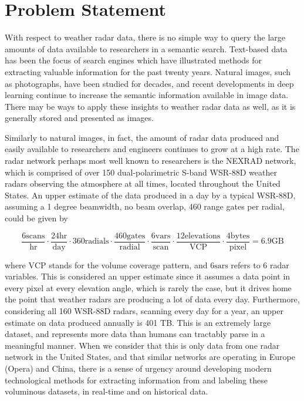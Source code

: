 \section{Problem Statement}
\label{sec:introduction_problem}

With respect to weather radar data, there is no simple way to query the large amounts of data available to researchers in a semantic search.
Text-based data has been the focus of search engines which have illustrated methods for extracting valuable information for the past twenty years. 
Natural images, such as photographs, have been studied for decades, and recent developments in deep learning continue to increase the semantic information available in image data.
There may be ways to apply these insights to weather radar data as well, as it is generally stored and presented as images.

Similarly to natural images, in fact, the amount of radar data produced and easily available to researchers and engineers continues to grow at a high rate.
The radar network perhaps most well known to researchers is the NEXRAD network, which is comprised of over 150 dual-polarimetric S-band WSR-88D weather radars observing the atmosphere at all times, located throughout the United States.
An upper estimate of the data produced in a day by a typical WSR-88D, assuming a 1 degree beamwidth, no beam overlap, 460 range gates per radial, could be given by

\begin{equation}
\frac{6 \mathrm{scans}}{\mathrm{hr}} \cdot \frac{24 \mathrm{hr}}{\mathrm{day}} \cdot 360 \mathrm{radials} \cdot \frac{460 \mathrm{gates}}{\mathrm{radial}} \cdot \frac{6 \mathrm{vars}}{\mathrm{scan}} \cdot \frac{12 \mathrm{elevations}}{\mathrm{VCP}} \cdot \frac{4 \mathrm{bytes}}{\mathrm{pixel}} = 6.9 \mathrm{GB}
\end{equation}

where $\mathrm{VCP}$ stands for the volume coverage pattern, and $6 \mathrm{sars}$ refers to 6 radar variables.
This is considered an upper estimate since it assumes a data point in every pixel at every elevation angle, which is rarely the case, but it drives home the point that weather radars are producing a lot of data every day.
Furthermore, considering all 160 WSR-88D radars, scanning every day for a year, an upper estimate on data produced annually is 401 TB. 
This is an extremely large dataset, and represents more data than humans can tractably parse in a meaningful manner.
When we consider that this is only data from one radar network in the United States, and that similar networks are operating in Europe (Opera) and China, there is a sense of urgency around developing modern technological methods for extracting information from and labeling these voluminous datasets, in real-time and on historical data.

